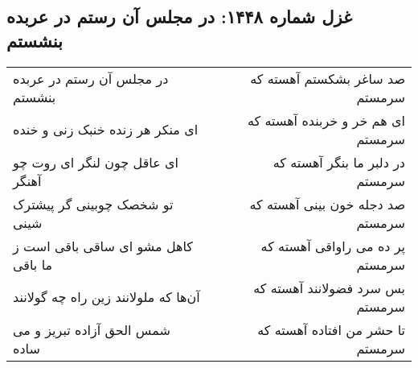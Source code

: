 \begin{center}
\section*{غزل شماره ۱۴۴۸: در مجلس آن رستم در عربده بنشستم}
\label{sec:1448}
\begin{longtable}{l p{0.5cm} r}
در مجلس آن رستم در عربده بنشستم
&&
صد ساغر بشکستم آهسته که سرمستم
\\
ای منکر هر زنده خنبک زنی و خنده
&&
ای هم خر و خربنده آهسته که سرمستم
\\
ای عاقل چون لنگر ای روت چو آهنگر
&&
در دلبر ما بنگر آهسته که سرمستم
\\
تو شخصک چوبینی گر پیشترک شینی
&&
صد دجله خون بینی آهسته که سرمستم
\\
کاهل مشو ای ساقی باقی است ز ما باقی
&&
پر ده می راواقی آهسته که سرمستم
\\
آن‌ها که ملولانند زین راه چه گولانند
&&
بس سرد فضولانند آهسته که سرمستم
\\
شمس الحق آزاده تبریز و می ساده
&&
تا حشر من افتاده آهسته که سرمستم
\\
\end{longtable}
\end{center}
